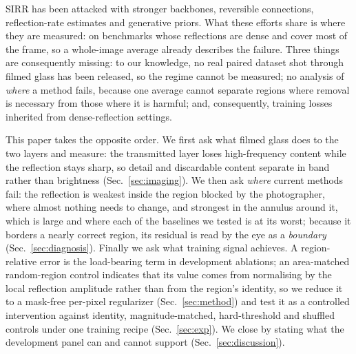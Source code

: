 SIRR has been attacked with stronger backbones, reversible connections, reflection-rate
estimates and generative priors. What these efforts
share is where they are measured: on benchmarks whose reflections are dense and cover
most of the frame, so a whole-image average already describes the failure. Three things
are consequently missing: to our knowledge, no real paired dataset shot through filmed
glass has been released, so the regime cannot be measured; no analysis of \emph{where}
a method fails, because one average cannot separate regions where removal is necessary
from those where it is harmful; and, consequently, training losses inherited from
dense-reflection settings.

This paper takes the opposite order. We first ask what filmed glass does to the two
layers and measure: the transmitted layer loses high-frequency content while the
reflection stays sharp, so detail and discardable content separate in band rather than
brightness (Sec.~\ref{sec:imaging}). We then
ask \emph{where} current methods fail: the reflection is weakest inside the region
blocked by the photographer, where almost nothing needs to change, and strongest in the
annulus around it, which is large and where each of the baselines we tested is at its
worst; because it borders a nearly correct region, its residual is read by the eye as a
\emph{boundary} (Sec.~\ref{sec:diagnosis}). Finally we ask what training signal
achieves. A region-relative error is the load-bearing term in development ablations; an
area-matched random-region control indicates that its value comes from normalising by the
local reflection amplitude rather than from the region's identity, so we reduce it to a
mask-free per-pixel regularizer (Sec.~\ref{sec:method}) and test it as a controlled
intervention against identity, magnitude-matched, hard-threshold and shuffled controls
under one training recipe (Sec.~\ref{sec:exp}). We close by stating what the development
panel can and cannot support (Sec.~\ref{sec:discussion}).


